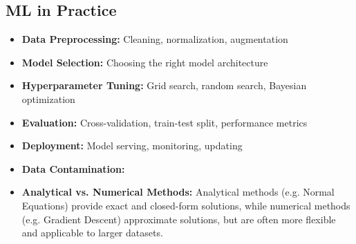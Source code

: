 \subsection{ML in Practice}
\begin{itemize}
    \item \textbf{Data Preprocessing:} Cleaning, normalization, augmentation
    \item \textbf{Model Selection:} Choosing the right model architecture
    \item \textbf{Hyperparameter Tuning:} Grid search, random search, Bayesian optimization
    \item \textbf{Evaluation:} Cross-validation, train-test split, performance metrics
    \item \textbf{Deployment:} Model serving, monitoring, updating
    \item \textbf{Data Contamination:} \todo
    \item \textbf{Analytical vs. Numerical Methods:} \revisit Analytical methods (e.g. Normal Equations) provide exact and closed-form solutions, while numerical methods (e.g. Gradient Descent) approximate solutions, but are often more flexible and applicable to larger datasets.
\end{itemize}